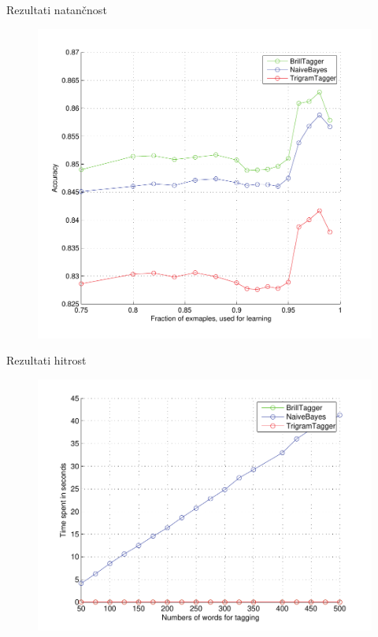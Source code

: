 \documentclass{beamer}
\begin{document}
\begin{frame}{Rezultati natančnost}
\begin{figure}[h]
\begin{center}
\includegraphics[height=0.85\textheight]{../evaluation/graph.pdf} 
\end{center}
\end{figure}
\end{frame}

\begin{frame}{Rezultati hitrost}
\begin{figure}[h]
\begin{center}
\includegraphics[height=0.85\textheight]{../evaluation/graph_speed.pdf} 
\end{center}
\end{figure}
\end{frame}
\end{document}

